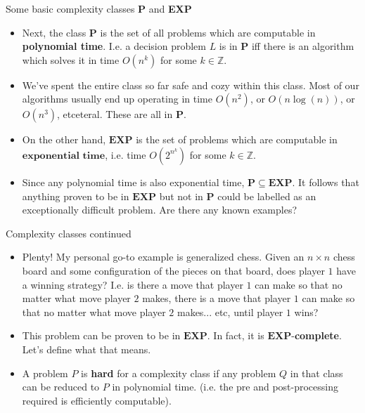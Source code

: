 \documentclass{beamer}
\begin{document}
\begin{frame}{Some basic complexity classes \textbf{P} and \textbf{EXP}}
    \begin{itemize}
        \item Next, the class $\mathbf{P}$ is the set of all problems which are computable in \textbf{polynomial time}. I.e. a decision problem $L$ is in $\mathbf{P}$ iff there is an algorithm which solves it in time $O(n^k)$ for some $k \in \mathbb{Z}$. 
        \item We've spent the entire class so far safe and cozy within this class. Most of our algorithms usually end up operating in time $O(n^2)$, or $O(n\log(n))$, or $O(n^3)$, etceteral. These are all in $\mathbf{P}$. 
        \item On the other hand, $\mathbf{EXP}$ is the set of problems which are computable in $\textbf{exponential time}$, i.e. time $O(2^{n^k})$ for some $k \in \mathbb{Z}$. 
        \item Since any polynomial time is also exponential time, $\mathbf{P} \subseteq \mathbf{EXP}$. It follows that anything proven to be in $\mathbf{EXP}$ but not in $\mathbf{P}$ could be labelled as an exceptionally difficult problem. Are there any known examples?
    \end{itemize}
\end{frame}

\begin{frame}{Complexity classes continued}
    \begin{itemize}
        \item Plenty! My personal go-to example is generalized chess. Given an $n \times n$ chess board and some configuration of the pieces on that board, does player $1$ have a winning strategy? I.e. is there a move that player $1$ can make so that no matter what move player $2$ makes, there is a move that player $1$ can make so that no matter what move player $2$ makes... etc, until player $1$ wins?
        \item This problem can be proven to be in $\mathbf{EXP}$. In fact, it is $\mathbf{EXP}$-\textbf{complete}. Let's define what that means. \pause 
        \item A problem $P$ is \textbf{hard} for a complexity class if any problem $Q$ in that class can be reduced to $P$ in polynomial time. (i.e. the pre and post-processing required is efficiently computable). 
    \end{itemize}
\end{frame}
\end{document}
